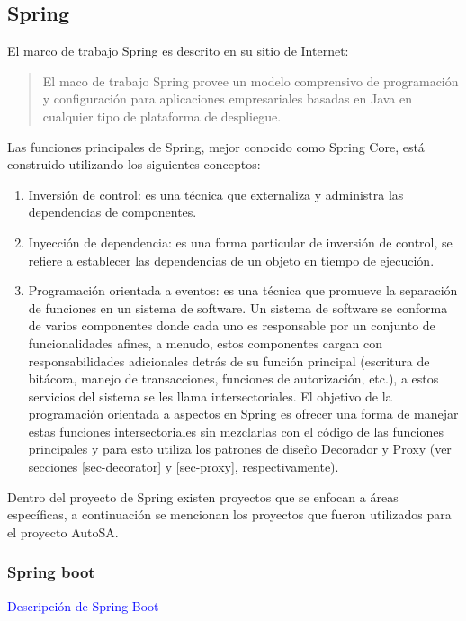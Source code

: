 \subsection{Spring}\label{sec-spring}
El marco de trabajo Spring es descrito en su sitio de Internet\cite{SpringFramework}:
\begin{quote}
	El maco de trabajo Spring provee un modelo comprensivo de programación y configuración para aplicaciones empresariales basadas en Java en cualquier tipo de plataforma de despliegue.
\end{quote}

Las funciones principales de Spring, mejor conocido como Spring Core, está construido utilizando los siguientes conceptos\cite{Spring5DesignPatterns, ProSpring5, WellGroundedJavaDeveloper, SpringInAction}:
\begin{enumerate}
	\item Inversión de control: es una técnica que externaliza y administra las dependencias de componentes.

	\item Inyección de dependencia: es una forma particular de inversión de control, se refiere a establecer las dependencias de un objeto en tiempo de ejecución.

	\item Programación orientada a eventos: es una técnica que promueve la separación de funciones en un sistema de software. Un sistema de software se conforma de varios componentes donde cada uno es responsable por un conjunto de funcionalidades afines, a menudo, estos componentes cargan con responsabilidades adicionales detrás de su función principal (escritura de bitácora, manejo de transacciones, funciones de autorización, etc.), a estos servicios del sistema se les llama intersectoriales. El objetivo de la programación orientada a aspectos en Spring  es ofrecer una forma de manejar estas funciones intersectoriales sin mezclarlas con el código de las funciones principales y para esto utiliza los patrones de diseño Decorador y Proxy (ver secciones \ref{sec-decorator} y \ref{sec-proxy}, respectivamente).
\end{enumerate}

Dentro del proyecto de Spring existen proyectos que se enfocan a áreas específicas, a continuación se mencionan los proyectos que fueron utilizados para el proyecto AutoSA.

\subsubsection{Spring boot}\label{sec-spring-boot}
\textcolor{blue}{Descripción de Spring Boot}\cite{SpringBootInAction}

